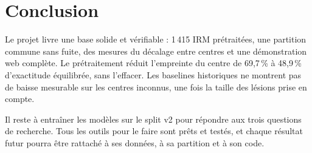 \documentclass[11pt,a4paper]{report}
\begin{document}
\chapter{Conclusion}

Le projet livre une base solide et vérifiable : 1\,415 IRM prétraitées, une
partition commune sans fuite, des mesures du décalage entre centres et une
démonstration web complète. Le prétraitement réduit l'empreinte du centre de
69,7\,\% à 48,9\,\% d'exactitude équilibrée, sans l'effacer. Les baselines
historiques ne montrent pas de baisse mesurable sur les centres inconnus,
une fois la taille des lésions prise en compte.

Il reste à entraîner les modèles sur le split v2 pour répondre aux trois
questions de recherche. Tous les outils pour le faire sont prêts et testés,
et chaque résultat futur pourra être rattaché à ses données, à sa partition
et à son code.
\end{document}
